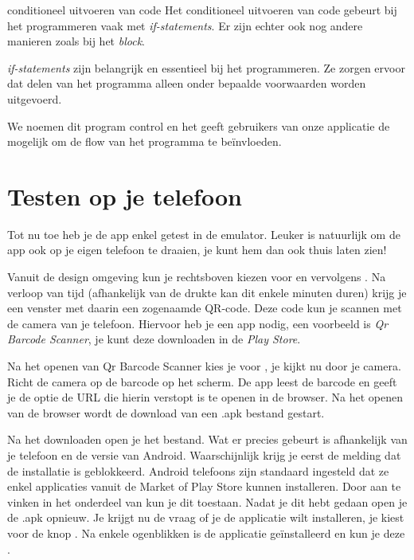 \begin{derivation}{conditioneel uitvoeren van code}
Het conditioneel uitvoeren van code gebeurt bij het programmeren vaak met \emph{if-statements}. Er zijn echter ook nog andere manieren zoals bij \ai het  \emph{block}.

\emph{if-statements} zijn belangrijk en essentieel bij het programmeren. Ze zorgen ervoor dat delen van het programma alleen onder bepaalde voorwaarden worden uitgevoerd.

We noemen dit program control en het geeft gebruikers van onze applicatie de mogelijk om de flow van het programma te beïnvloeden.
\end{derivation}


\section{Testen op je telefoon}
\runOpTelefoon{} Tot nu toe heb je de app enkel getest in de emulator. Leuker is natuurlijk om de app ook op je eigen telefoon te draaien, je kunt hem dan ook thuis laten zien!

Vanuit de design omgeving kun je rechtsboven kiezen voor  en vervolgens . Na verloop van tijd (afhankelijk van de drukte kan dit enkele minuten duren) krijg je een venster met daarin een zogenaamde QR-code. Deze code kun je scannen met de camera van je telefoon. Hiervoor heb je een app nodig, een voorbeeld is \emph{Qr Barcode Scanner}, je kunt deze downloaden in de \emph{Play Store}.

Na het openen van Qr Barcode Scanner kies je voor , je kijkt nu door je camera. Richt de camera op de barcode op het scherm. De app leest de barcode en geeft je de optie de URL die hierin verstopt is te openen in de browser. Na het openen van de browser wordt de download van een .apk bestand gestart. 

Na het downloaden open je het bestand. Wat er precies gebeurt is afhankelijk van je telefoon en de versie van Android. Waarschijnlijk krijg je eerst de melding dat de installatie is geblokkeerd. Android telefoons zijn standaard ingesteld dat ze enkel applicaties vanuit de Market of Play Store kunnen installeren. Door  aan te vinken in het  onderdeel van  kun je dit toestaan. Nadat je dit hebt gedaan open je de .apk opnieuw. Je krijgt nu de vraag of je de applicatie wilt installeren, je kiest voor de knop . Na enkele ogenblikken is de applicatie ge\"installeerd en kun je deze . 

